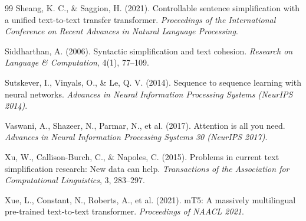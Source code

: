 \documentclass[12pt]{report}
\begin{document}
\begin{thebibliography}{99}
Sheang, K. C., \& Saggion, H. (2021).
Controllable sentence simplification with a unified text-to-text transfer transformer.
\textit{Proceedings of the International Conference on Recent Advances in Natural Language Processing}.

Siddharthan, A. (2006).
Syntactic simplification and text cohesion.
\textit{Research on Language \& Computation}, 4(1), 77--109.

Sutskever, I., Vinyals, O., \& Le, Q. V. (2014).
Sequence to sequence learning with neural networks.
\textit{Advances in Neural Information Processing Systems (NeurIPS 2014)}.

Vaswani, A., Shazeer, N., Parmar, N., et al. (2017).
Attention is all you need.
\textit{Advances in Neural Information Processing Systems 30 (NeurIPS 2017)}.

Xu, W., Callison-Burch, C., \& Napoles, C. (2015).
Problems in current text simplification research: New data can help.
\textit{Transactions of the Association for Computational Linguistics}, 3, 283--297.

Xue, L., Constant, N., Roberts, A., et al. (2021).
mT5: A massively multilingual pre-trained text-to-text transformer.
\textit{Proceedings of NAACL 2021}.

\end{thebibliography}

\end{document}
